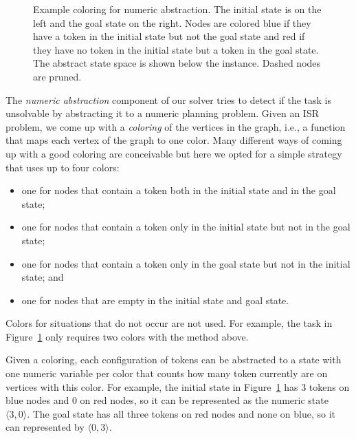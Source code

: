\begin{figure}[hb]
  \caption{ Example coloring for numeric abstraction. The initial state is on
      the left and the goal state on the right. Nodes are colored blue if they have a
      token in the initial state but not the goal state and red if they have no token
      in the initial state but a token in the goal state. The abstract state space is
      shown below the instance. Dashed nodes are pruned.}
  \label{fig:numeric-abstractions-example}
\end{figure}

The \emph{numeric abstraction} component of our solver tries to detect if the
task is unsolvable by abstracting it to a numeric planning problem. Given an ISR
problem, we come up with a \emph{coloring} of the vertices in the graph, i.e., a
function that maps each vertex of the graph to one color. Many different ways of
coming up with a good coloring are conceivable but here we opted for a simple
strategy that uses up to four colors:
\begin{itemize}
    \item one for nodes that contain a token both in the initial state and in the goal state;
    \item one for nodes that contain a token only in the initial state but not in the goal state;
    \item one for nodes that contain a token only in the goal state but not in the initial state; and
    \item one for nodes that are empty in the initial state and goal state.
\end{itemize}

Colors for situations that do not occur are not used. For example, the task in
Figure~\ref{fig:numeric-abstractions-example} only requires two colors with the
method above.

Given a coloring, each configuration of tokens can be abstracted to a state with
one numeric variable per color that counts how many token currently are on
vertices with this color. For example, the initial state in
Figure~\ref{fig:numeric-abstractions-example} has 3 tokens on blue nodes and 0
on red nodes, so it can be represented as the numeric state $\langle 3,
0\rangle$. The goal state has all three tokens on red nodes and none on blue, so
it can represented by $\langle 0, 3 \rangle$.

